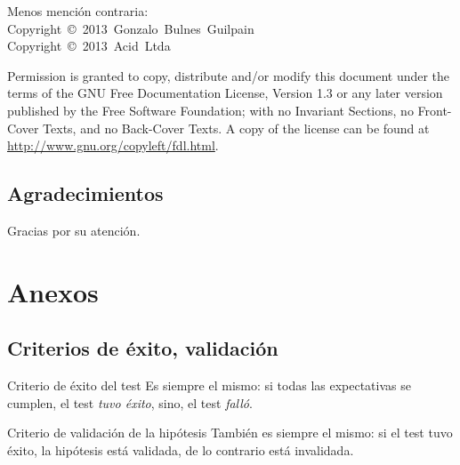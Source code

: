 \begin{frame}{\insertsubsection}
    \scriptsize{Menos mención contraria:}\\
    \noindent\scriptsize{Copyright~\copyright~2013~Gonzalo~Bulnes~Guilpain}\\
    \noindent\scriptsize{Copyright~\copyright~2013~Acid~Ltda}

    \scriptsize{Permission is granted to copy, distribute and/or modify this document
    under the terms of the GNU Free Documentation License, Version 1.3
    or any later version published by the Free Software Foundation;
    with no Invariant Sections, no Front-Cover Texts, and no Back-Cover Texts.
    A copy of the license can be found at \url{http://www.gnu.org/copyleft/fdl.html}.}
  \end{frame}

%
\subsection{Agradecimientos}

  \begin{frame}
    \vspace{0mm}
    \begin{center}
      Gracias por su atención.
    \end{center}
  \end{frame}

\appendix

\section{Anexos}

%
\subsection{Criterios de éxito, validación}

\begin{frame}[label=criterios]
  \begin{block}{Criterio de éxito del test}
    Es siempre el mismo: si \alert{todas} las expectativas se cumplen, el test \emph{tuvo éxito}, sino, el test \emph{falló}.
  \end{block}
  \begin{block}{Criterio de validación de la hipótesis}
    También es siempre el mismo: si el test tuvo éxito, la hipótesis está validada, de lo contrario está invalidada.
  \end{block}
  \hfill \hyperlink{expectativa}{}
\end{frame}
